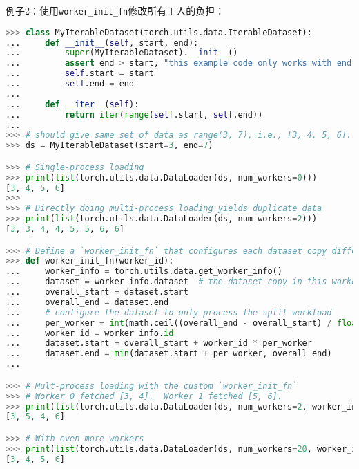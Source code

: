 \documentclass[../main.tex]{subfile}
\begin{document}
例子2：使用\lstinline{worker_init_fn}修改所有工人的负担：
\begin{lstlisting}[language=Python]
>>> class MyIterableDataset(torch.utils.data.IterableDataset):
...     def __init__(self, start, end):
...         super(MyIterableDataset).__init__()
...         assert end > start, "this example code only works with end >= start"
...         self.start = start
...         self.end = end
...
...     def __iter__(self):
...         return iter(range(self.start, self.end))
...
>>> # should give same set of data as range(3, 7), i.e., [3, 4, 5, 6].
>>> ds = MyIterableDataset(start=3, end=7)

>>> # Single-process loading
>>> print(list(torch.utils.data.DataLoader(ds, num_workers=0)))
[3, 4, 5, 6]
>>>
>>> # Directly doing multi-process loading yields duplicate data
>>> print(list(torch.utils.data.DataLoader(ds, num_workers=2)))
[3, 3, 4, 4, 5, 5, 6, 6]

>>> # Define a `worker_init_fn` that configures each dataset copy differently
>>> def worker_init_fn(worker_id):
...     worker_info = torch.utils.data.get_worker_info()
...     dataset = worker_info.dataset  # the dataset copy in this worker process
...     overall_start = dataset.start
...     overall_end = dataset.end
...     # configure the dataset to only process the split workload
...     per_worker = int(math.ceil((overall_end - overall_start) / float(worker_info.num_workers)))
...     worker_id = worker_info.id
...     dataset.start = overall_start + worker_id * per_worker
...     dataset.end = min(dataset.start + per_worker, overall_end)
...

>>> # Mult-process loading with the custom `worker_init_fn`
>>> # Worker 0 fetched [3, 4].  Worker 1 fetched [5, 6].
>>> print(list(torch.utils.data.DataLoader(ds, num_workers=2, worker_init_fn=worker_init_fn)))
[3, 5, 4, 6]

>>> # With even more workers
>>> print(list(torch.utils.data.DataLoader(ds, num_workers=20, worker_init_fn=worker_init_fn)))
[3, 4, 5, 6]
\end{lstlisting}
\end{document}
